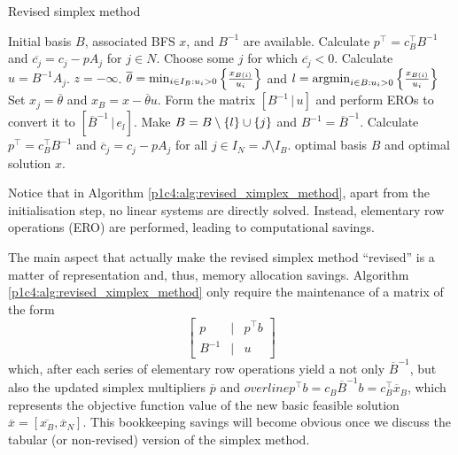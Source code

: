 \begin{algorithm}[h]
	\caption{Revised simplex method} \label{p1c4:alg:revised_ximplex_method}
	\begin{algorithmic}[1] %
	 Initial basis $B$, associated BFS $x$, and $B^{-1}$ are available.
	\State Calculate $p^\top = c_B^\top B^{-1}$ and $\overline{c_j} = c_j - pA_j$ for $j \in N$.
	 \label{p1c4:alg:opt_condition} 
	    \State Choose some $j$ for which $\overline{c_j} < 0$. Calculate $u = B^{-1}A_j$. 
	     \label{p1c4:alg:unb_condition}
			 $z = -\infty$.		
		\Else
			\State $\overline{\theta} = \min_{i \in I_B : u_i > 0} \left\{ \frac{x_{B(i)}}{u_i} \right \}$ and $l = \mathop{\rm argmin}_{i \in B : u_i > 0} \left\{ \frac{x_{B(i)}}{u_i} \right \}$ 
			\State Set $x_j = \overline{\theta}$ and $x_B = x - \overline{\theta}u$.
			\State Form the matrix $[B^{-1} \,|\, u]$ and perform EROs to convert it to $[\overline{B}^{-1} \, | \, e_l]$. 
			\State Make $B = B \setminus \left\{ l \right \} \cup \left\{ j \right \}$ and $B^{-1} = \overline{B}^{-1}$. 
			\State Calculate $p^\top = c_B^\top B^{-1}$ and $\overline{c}_j = c_j - pA_j$ for all $j \in I_N = J \setminus I_B$.
		\EndIf
	\EndWhile
	 optimal basis $B$ and optimal solution $x$.
	\end{algorithmic}
\end{algorithm}

Notice that in Algorithm \ref{p1c4:alg:revised_ximplex_method}, apart from the initialisation step, no linear systems are directly solved. Instead, elementary row operations (ERO) are performed, leading to computational savings.

The main aspect that actually make the revised simplex method ``revised'' is a matter of representation and, thus, memory allocation savings. Algorithm \ref{p1c4:alg:revised_ximplex_method} only require the maintenance of a matrix of the form 
%
\begin{equation*}
	\begin{bmatrix}
		p & | & p^\top b \\
		B^{-1} & | & u	
	\end{bmatrix}
\end{equation*}
%  
which, after each series of elementary row operations yield a not only $\overline{B}^{-1}$, but also the updated simplex multipliers $\overline{p}$ and $overline{p}^\top b = c_B \overline{B}^{-1}b = c_B ^\top \overline{x}_B$, which represents the objective function value of the new basic feasible solution $\overline{x} = [\overline{x_B}, \overline{x}_N]$. This bookkeeping savings will become obvious once we discuss the tabular (or non-revised) version of the simplex method. 

